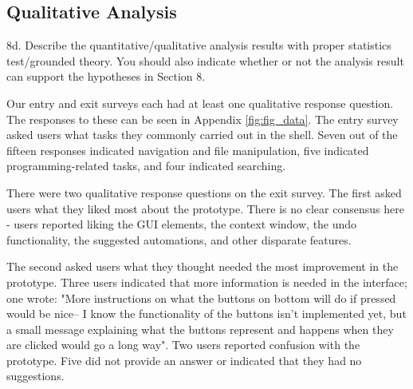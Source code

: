 \subsection{Qualitative Analysis}
    8d. Describe the quantitative/qualitative analysis results with proper
    statistics test/grounded theory. You should also indicate whether or not the
    analysis result can support the hypotheses in Section 8.

Our entry and exit surveys each had at least one qualitative response question.
The responses to these can be seen in Appendix \ref{fig:fig_data}.
The entry survey asked users what tasks they commonly carried out in the shell.
Seven out of the fifteen responses indicated navigation and file manipulation,
five indicated programming-related tasks, and four indicated searching.

There were two qualitative response questions on the exit survey. The first
asked users what they liked most about the prototype. There is no clear
consensus here - users reported liking the GUI elements, the context window, the
undo functionality, the suggested automations, and other disparate features.

The second asked users what they thought needed the most improvement in the
prototype. Three users indicated that more information is needed in the
interface; one wrote: "More instructions on what the buttons on bottom will do
if pressed would be nice-- I know the functionality of the buttons isn't
implemented yet, but a small message explaining what the buttons represent and
happens when they are clicked would go a long way". Two users reported confusion
with the prototype. Five did not provide an answer or indicated that they had no
suggestions.

